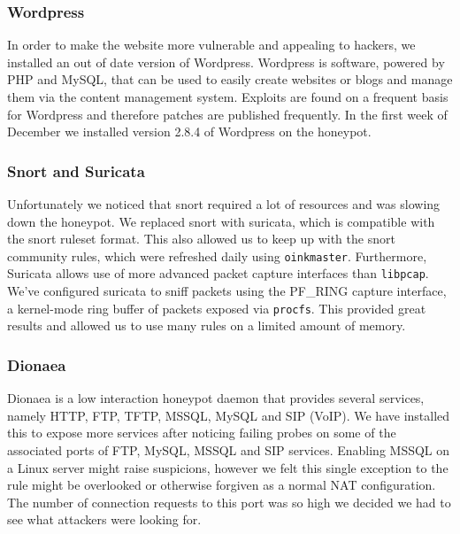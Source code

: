 \documentclass[11pt]{article}
\begin{document}
\subsubsection{Wordpress}
In order to make the website more vulnerable and appealing to hackers, we installed an out of date version of Wordpress. Wordpress is software, powered by PHP and MySQL, that can be used to easily create websites or blogs and manage them via the content management system. Exploits are found on a frequent basis for Wordpress and therefore patches are published frequently. In the first week of December we installed version 2.8.4 of Wordpress on the honeypot.

\subsubsection{Snort and Suricata}
Unfortunately we noticed that snort required a lot of resources and was slowing down the honeypot. We replaced snort with suricata, which is compatible with the snort ruleset format.
This also allowed us to keep up with the snort community rules, which were refreshed daily using \verb|oinkmaster|.
Furthermore, Suricata allows use of more advanced packet capture interfaces than \verb|libpcap|.
We've configured suricata to sniff packets using the PF\_RING capture interface, a kernel-mode ring buffer of packets exposed via \verb|procfs|.
This provided great results and allowed us to use many rules on a limited amount of memory.

\subsubsection{Dionaea}
Dionaea is a low interaction honeypot daemon that provides several services, namely HTTP, FTP, TFTP, MSSQL, MySQL and SIP (VoIP).
We have installed this to expose more services after noticing failing probes on some of the associated ports of FTP, MySQL, MSSQL and SIP services. 
Enabling MSSQL on a Linux server might raise suspicions, however we felt this single exception to the rule might be overlooked or otherwise forgiven as a normal NAT configuration.
The number of connection requests to this port was so high we decided we had to see what attackers were looking for.

\end{document}
